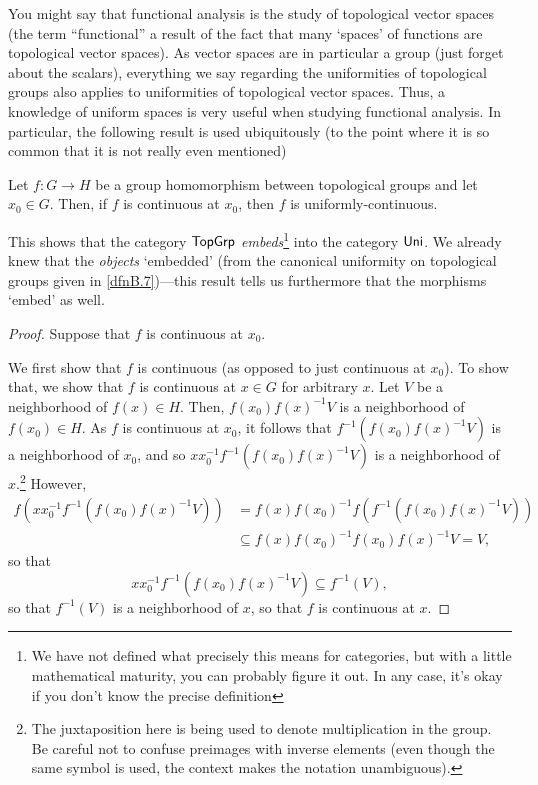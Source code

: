 You might say that functional analysis is the study of topological vector spaces (the term ``functional'' a result of the fact that many `spaces' of functions are topological vector spaces).  As vector spaces are in particular a group (just forget about the scalars), everything we say regarding the uniformities of topological groups also applies to uniformities of topological vector spaces.  Thus, a knowledge of uniform spaces is very useful when studying functional analysis.  In particular, the following result is used ubiquitously (to the point where it is so common that it is not really even mentioned)
\begin{prp}\label{prpB.10}
\begin{savenotes}
Let $f:G\rightarrow H$ be a group homomorphism between topological groups and let $x_0\in G$.  Then, if $f$ is continuous at $x_0$, then $f$ is uniformly-continuous.
\begin{rmk}
This shows that the category $\mathsf{Top} \mathsf{Grp}$ \emph{embeds}\footnote{We have not defined what precisely this means for categories, but with a little mathematical maturity, you can probably figure it out.  In any case, it's okay if you don't know the precise definition} into the category $\mathsf{Uni}$.  We already knew that the \emph{objects} `embedded' (from the canonical uniformity on topological groups given in \cref{dfnB.7})---this result tells us furthermore that the morphisms `embed' as well.
\end{rmk}
\begin{proof}
Suppose that $f$ is continuous at $x_0$.

We first show that $f$ is continuous (as opposed to just continuous at $x_0$).  To show that, we show that $f$ is continuous at $x\in G$ for arbitrary $x$.  Let $V$ be a neighborhood of $f(x)\in H$.  Then, $f(x_0)f(x)^{-1}V$ is a neighborhood of $f(x_0)\in H$.  As $f$ is continuous at $x_0$, it follows that $f^{-1}\left( f(x_0)f(x)^{-1}V\right)$ is a neighborhood of $x_0$, and so $xx_0^{-1}f^{-1}\left( f(x_0)f(x)^{-1}V\right)$ is a neighborhood of $x$.\footnote{The juxtaposition here is being used to denote multiplication in the group.  Be careful not to confuse preimages with inverse elements (even though the same symbol is used, the context makes the notation unambiguous).}  However,
\begin{equation}
\begin{split}
f\left( xx_0^{-1}f^{-1}\left( f(x_0)f(x)^{-1}V\right) \right) & =f(x)f(x_0)^{-1}f\left( f^{-1}\left( f(x_0)f(x)^{-1}V\right) \right) \\
& \subseteq f(x)f(x_0)^{-1}f(x_0)f(x)^{-1}V=V,
\end{split}
\end{equation}
so that
\begin{equation}
xx_0^{-1}f^{-1}\left( f(x_0)f(x)^{-1}V\right) \subseteq f^{-1}(V),
\end{equation}
so that $f^{-1}(V)$ is a neighborhood of $x$, so that $f$ is continuous at $x$.


\end{proof}
\end{savenotes}
\end{prp}
